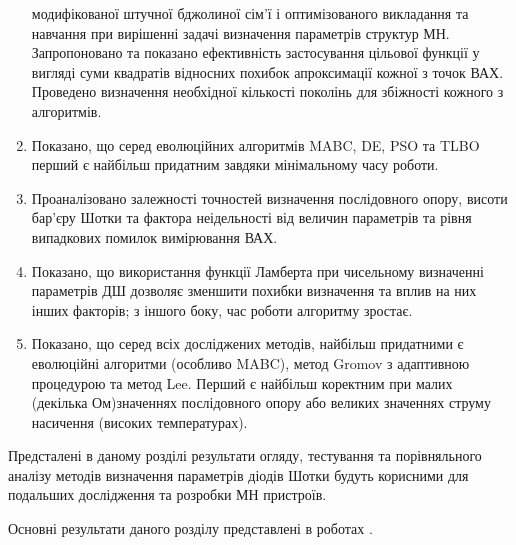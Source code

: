 \begin{enumerate}
модифікованої штучної бджолиної сім'ї і оптимізованого викладання та навчання при вирішенні задачі визначення параметрів структур МН.
Запропоновано та показано ефективність застосування цільової функції у вигляді суми квадратів відносних похибок апроксимації кожної з точок ВАХ.
Проведено визначення необхідної кількості поколінь для збіжності кожного з алгоритмів.
   \item Показано, що серед еволюційних алгоритмів MABC, DE, PSO та TLBO перший є найбільш придатним завдяки мінімальному часу роботи.
   \item Проаналізовано залежності точностей визначення послідовного опору, висоти бар'єру Шотки та фактора неідельності від величин параметрів та рівня випадкових помилок вимірювання ВАХ.
   \item Показано, що використання функції Ламберта при чисельному визначенні параметрів ДШ дозволяє зменшити похибки визначення та вплив на них інших факторів; з іншого боку, час роботи алгоритму зростає.
   \item Показано, що серед всіх досліджених методів, найбільш придатними є еволюційні алгоритми (особливо MABC), метод Gromov з адаптивною процедурою та метод Lee.
    Перший є найбільш коректним при малих (декілька Ом)значеннях послідовного опору або великих значеннях струму насичення (високих температурах).
  \end{enumerate}

Предсталені в даному розділі результати огляду, тестування та порівняльного аналізу методів визначення параметрів діодів Шотки будуть корисними для подальших дослідження та розробки
МН пристроїв.

Основні результати даного розділу представлені в роботах \cite{Olikh:Rev,6CPFCS}.
